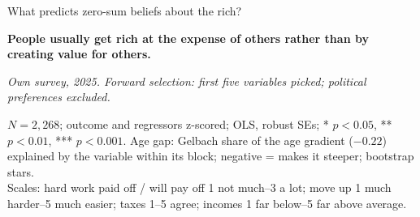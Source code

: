 \documentclass[aspectratio=169]{beamer}
\begin{document}
\begin{frame}{What predicts zero-sum beliefs about the rich?}

\begin{center}
{\footnotesize\textbf{People usually get rich at the expense of others rather than by creating value for others.}\par}
{\scriptsize\itshape Own survey, 2025. Forward selection: first five variables picked; political preferences excluded.\par}
\vspace{0.1em}
{\scriptsize\setlength{\tabcolsep}{4pt}\renewcommand{\arraystretch}{0.82}
}
\end{center}
\vspace{-0.5em}
{\tiny\centering $N = 2{,}268$; outcome and regressors z-scored; OLS, robust SEs; * $p<0.05$, ** $p<0.01$, *** $p<0.001$. Age gap: Gelbach share of the age gradient ($-0.22$) explained by the variable within its block; negative = makes it steeper; bootstrap stars.\\
Scales: hard work paid off / will pay off 1 not much--3 a lot; move up 1 much harder--5 much easier; taxes 1--5 agree; incomes 1 far below--5 far above average.\par}

\end{frame}



%
%
\end{document}
